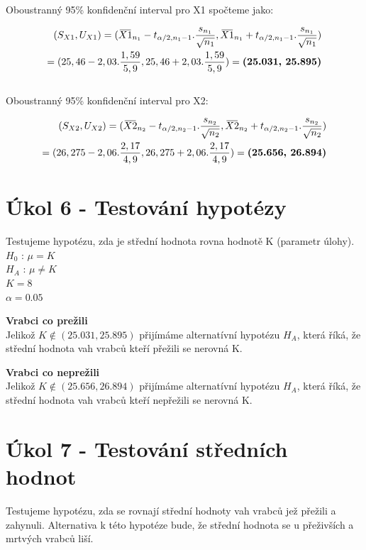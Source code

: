 \documentclass[12pt,a4paper]{article}
\newcommand{\overbar}[1]{\mkern 2.5mu\overline{\mkern-2.5mu#1\mkern-2.5mu}\mkern 2.5mu}
\begin{document}
Oboustranný 95\% konfidenční interval pro X1 spočteme jako:

\begin{gather}
\begin{align}
(S_{X1},U_{X1})
= (\overbar{X1}_{n_1} - t_{\alpha/2,n_1-1}.\frac{s_{n_1}}{\sqrt{n_1}},
   \overbar{X1}_{n_1} + t_{\alpha/2,n_1-1}.\frac{s_{n_1}}{\sqrt{n_1}}) \nonumber\\
= (25,46 - 2,03.\frac{1,59}{5,9},
   25,46 + 2,03.\frac{1,59}{5,9})
= \textbf{(25.031, 25.895)}
\end{align}
\end{gather}\\

Oboustranný 95\% konfidenční interval pro X2:

\begin{align}
(S_{X2},U_{X2}) = 
(\overbar{X2}_{n_2} - t_{\alpha/2,n_2-1}.\frac{s_{n_2}}{\sqrt{n_2}},
 \overbar{X2}_{n_2} + t_{\alpha/2,n_2-1}.\frac{s_{n_2}	}{\sqrt{n_2}}) \nonumber\\
= (26,275 - 2,06.\frac{2,17}{4,9},
   26,275 + 2,06.\frac{2,17}{4,9})
= \textbf{(25.656, 26.894)}
\end{align}

\section{Úkol 6 - Testování hypotézy}
Testujeme hypotézu, zda je střední hodnota rovna hodnotě K (parametr úlohy).\\[0.4cm]
$H_0$ : $\mu = K$\\
$H_A$ : $\mu \neq K$\\
$K = 8$\\
$\alpha = 0.05$\par \medskip
\textbf{Vrabci co prežili}\\
Jelikož $K \notin (25.031, 25.895)$ přijímáme alternatívní hypotézu $H_A$, která říká, že střední hodnota vah vrabců kteří přežili se nerovná K.
\par \medskip
\textbf{Vrabci co neprežili}\\
Jelikož $K \notin (25.656, 26.894)$ přijímáme alternatívní hypotézu $H_A$, která říká, že střední hodnota vah vrabců kteří nepřežili se nerovná K.

\section{Úkol 7 - Testování středních hodnot}
Testujeme hypotézu, zda se rovnají střední hodnoty vah vrabců jež přežili a zahynuli. Alternativa k této hypotéze bude, že střední hodnota se u přeživších a mrtvých vrabců liší.
\end{document}
